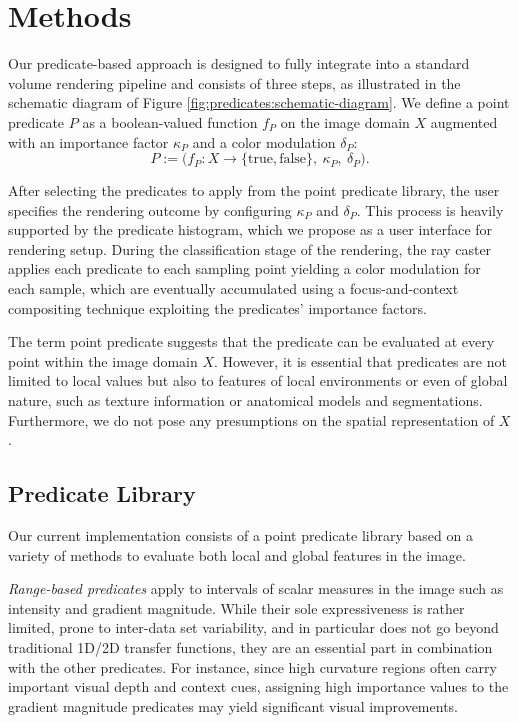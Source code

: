 \section*{Methods}


Our predicate-based approach is designed to fully integrate into a standard volume rendering pipeline and consists of three steps, as illustrated in the schematic diagram of Figure \ref{fig:predicates:schematic-diagram}. 
We define a point predicate $P$ as a boolean-valued function $f_P$ on the image domain $X$ augmented with an importance factor $\kappa_P$ and a color modulation $\delta_P$:
\begin{equation}
	P := \big( f_P : X \rightarrow \{ \text{true}, \text{false} \}, \ \kappa_P, \ \delta_P \big).
\end{equation}

After selecting the predicates to apply from the point predicate library, the user specifies the rendering outcome by configuring $\kappa_P$ and $\delta_P$. 
This process is heavily supported by the predicate histogram, which we propose as a user interface for rendering setup. 
During the classification stage of the rendering, the ray caster applies each predicate to each sampling point yielding a color modulation for each sample, which are eventually accumulated using a focus-and-context compositing technique exploiting the predicates' importance factors. 

The term point predicate suggests that the predicate can be evaluated at every point within the image domain $X$. 
However, it is essential that predicates are not limited to local values but also to features of local environments or even of global nature, such as texture information or anatomical models and segmentations. 
Furthermore, we do not pose any presumptions on the spatial representation of $X$. 




\subsection{Predicate Library}
\label{sec:predicates:methods:predicates}

Our current implementation consists of a point predicate library based on a variety of methods to evaluate both local and global features in the image. 

\emph{Range-based predicates} apply to intervals of scalar measures in the image such as intensity and gradient magnitude. 
While their sole expressiveness is rather limited, prone to inter-data set variability, and in particular does not go beyond traditional 1D/2D transfer functions, they are an essential part in combination with the other predicates. 
For instance, since high curvature regions often carry important visual depth and context cues, assigning high importance values to the gradient magnitude predicates may yield significant visual improvements. 


